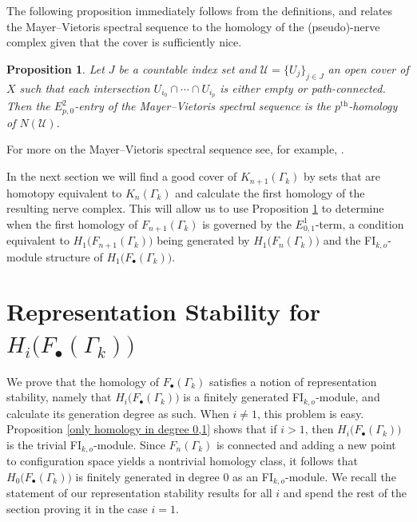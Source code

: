 \documentclass[pagebackref,colorlinks,citecolor=blue,linkcolor=blue,urlcolor=blue,filecolor=blue]{article}
\newtheorem{prop}[thm]{Proposition}
\theoremstyle{definition}\newtheorem{definition}[thm]{Definition}
\theoremstyle{definition}
\begin{document}
The following proposition immediately follows from the definitions, and relates the Mayer--Vietoris spectral sequence to the homology of the (pseudo)-nerve complex given that the cover is sufficiently nice.

\begin{prop}\label{E2 of mayer--vietoris}
Let $J$ be a countable index set and $\mathcal{U}=\{U_{j}\}_{j\in J}$ an open cover of $X$ such that each intersection $U_{i_{0}}\cap\cdots\cap U_{i_{p}}$ is either empty or path-connected.
Then the $E^{2}_{p,0}$-entry of the Mayer--Vietoris spectral sequence is the $p^{\text{th}}$-homology of $N(\mathcal{U})$.
\end{prop}

For more on the Mayer--Vietoris spectral sequence see, for example, \cite[Chapter 7.4]{brown2012cohomology}.

In the next section we will find a good cover of $K_{n+1}(\Gamma_{k})$ by sets that are homotopy equivalent to $K_{n}(\Gamma_{k})$ and calculate the first homology of the resulting nerve complex.
This will allow us to use Proposition \ref{E2 of mayer--vietoris} to determine when the first homology of $F_{n+1}(\Gamma_{k})$ is governed by the $E^{1}_{0,1}$-term, a condition equivalent to $H_{1}\big(F_{n+1}(\Gamma_{k})\big)$ being generated by $H_{1}\big(F_{n}(\Gamma_{k})\big)$ and the FI$_{k,o}$-module structure of $H_{1}\big(F_{\bullet}(\Gamma_{k})\big)$.

\section{Representation Stability for $H_{i}\big(F_{\bullet}(\Gamma_{k})\big)$}\label{rep stab section}

We prove that the homology of $F_{\bullet}(\Gamma_{k})$ satisfies a notion of representation stability, namely that $H_{i}\big(F_{\bullet}(\Gamma_{k})\big)$ is a finitely generated FI$_{k,o}$-module, and calculate its generation degree as such.
When $i\neq 1$, this problem is easy.
Proposition \ref{only homology in degree 0,1} shows that if $i>1$, then $H_{i}\big(F_{\bullet}(\Gamma_{k})\big)$ is the trivial FI$_{k,o}$-module.
Since $F_{n}(\Gamma_{k})$ is connected and adding a new point to configuration space yields a nontrivial homology class, it follows that $H_{0}\big(F_{\bullet}(\Gamma_{k})\big)$ is finitely generated in degree $0$ as an FI$_{k,o}$-module.
We recall the statement of our representation stability results for all $i$ and spend the rest of the section proving it in the case $i=1$.
\end{document}
